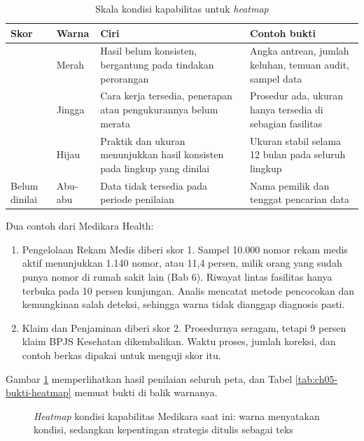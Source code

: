 \begin{table}[!htb]
  \centering
  \caption{Skala kondisi kapabilitas untuk \textit{heatmap}}
  \label{tab:ch05-skala}
  \small
  \begin{tabularx}{\textwidth}{>{\raggedright\arraybackslash}p{1.5cm}l>{\raggedright\arraybackslash}X>{\raggedright\arraybackslash}X}
    \hline
    \textbf{Skor} & \textbf{Warna} & \textbf{Ciri} & \textbf{Contoh bukti} \\
    \hline
    1 & Merah & Hasil belum konsisten, bergantung pada tindakan perorangan & Angka antrean, jumlah keluhan, temuan audit, sampel data \\
    \hline
    2 & Jingga & Cara kerja tersedia, penerapan atau pengukurannya belum merata & Prosedur ada, ukuran hanya tersedia di sebagian fasilitas \\
    \hline
    3 & Hijau & Praktik dan ukuran menunjukkan hasil konsisten pada lingkup yang dinilai & Ukuran stabil selama 12 bulan pada seluruh lingkup \\
    \hline
    Belum dinilai & Abu-abu & Data tidak tersedia pada periode penilaian & Nama pemilik dan tenggat pencarian data \\
    \hline
  \end{tabularx}
\end{table}

Dua contoh dari Medikara Health:

\begin{enumerate}
  \item Pengelolaan Rekam Medis diberi skor 1. Sampel 10.000 nomor rekam medis aktif menunjukkan 1.140
        nomor, atau 11,4 persen, milik orang yang sudah punya nomor di rumah sakit lain (Bab 6). Riwayat
        lintas fasilitas hanya terbuka pada 10 persen kunjungan. Analis mencatat metode pencocokan dan
        kemungkinan salah deteksi, sehingga warna tidak dianggap diagnosis pasti.
  \item Klaim dan Penjaminan diberi skor 2. Prosedurnya seragam, tetapi 9 persen klaim BPJS Kesehatan
        dikembalikan. Waktu proses, jumlah koreksi, dan contoh berkas dipakai untuk menguji skor itu.
\end{enumerate}

Gambar \ref{fig:ch05-heatmap} memperlihatkan hasil penilaian seluruh peta, dan Tabel
\ref{tab:ch05-bukti-heatmap} memuat bukti di balik warnanya.

\begin{figure}[!htb]
  \centering
  
  \caption{\textit{Heatmap} kondisi kapabilitas Medikara saat ini: warna menyatakan kondisi, sedangkan
           kepentingan strategis ditulis sebagai teks}
  \label{fig:ch05-heatmap}
\end{figure}

